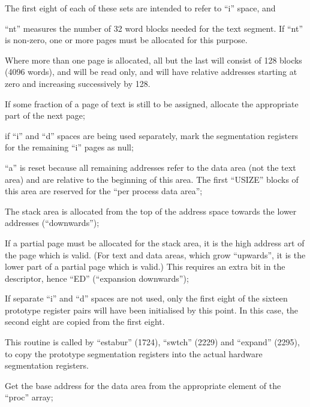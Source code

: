 The first eight of each of these sets
are intended to refer to ``i'' space, and

\bd
\item[1667:] ``nt'' measures the number of 32
 word blocks needed for the text
 segment. If ``nt'' is non-zero,
 one or more pages must be allocated for this purpose.
\ed

Where more than one page is allocated,
all but the last will consist of 128
blocks (4096 words), and will be read
only, and will have relative addresses
starting at zero and increasing successively by 128.

\bd
\item[1672:] If some fraction of a page of
 text is still to be assigned,
 allocate the appropriate part of
 the next page;

\item[1677:] if ``i'' and ``d'' spaces are being
 used separately, mark the segmentation registers for the 
remaining ``i'' pages as null;

\item[1682:] ``a'' is reset because all remaining addresses refer to the data
area (not the text area) and are
relative to the beginning of this
area. The first ``USIZE'' blocks
of this area are reserved for the
``per process data area'';

\item[1703:] The stack area is allocated from
 the top of the address space
 towards the lower addresses
 (``downwards'');

\item[1711:] If a partial page must be allocated for the stack area, it is
 the high address art of the page
 which is valid. (For text and
 data areas, which grow ``upwards'',
 it is the lower part of a partial
 page which is valid.) This
 requires an extra bit in the
 descriptor, hence ``ED'' (``expansion downwards'');

\item[1714:] If separate ``i'' and ``d'' spaces
 are not used, only the first
 eight of the sixteen prototype
 register pairs will have been
 initialised by this point. In
 this case, the second eight are
 copied from the first eight.
\ed



This routine is called by ``estabur''
(1724), ``swtch'' (2229) and ``expand''
(2295), to copy the prototype
segmentation registers into the actual
hardware segmentation registers.


\bd
\item[1743:] Get the base address for the data
 area from the appropriate element
 of the ``proc'' array;

